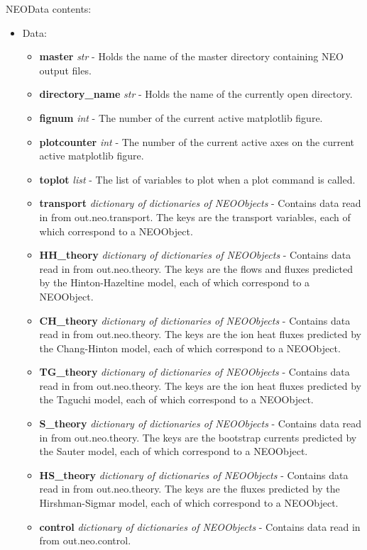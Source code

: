 \documentclass{article}
\begin{document}
NEOData contents:
\begin{itemize}
\item Data:
\begin{itemize}
\item \textbf{master} \emph{str} - Holds the name of the master directory containing NEO output files.
\item \textbf{directory\_name} \emph{str} - Holds the name of the currently open directory.
\item \textbf{fignum} \emph{int} - The number of the current active matplotlib figure.
\item \textbf{plotcounter} \emph{int} - The number of the current active axes on the current active matplotlib figure.
\item \textbf{toplot} \emph{list} - The list of variables to plot when a plot command is called.
\item \textbf{transport} \emph{dictionary of dictionaries of NEOObjects} - Contains data read in from out.neo.transport.  The keys are the transport variables, each of which correspond to a NEOObject.
\item \textbf{HH\_theory} \emph{dictionary of dictionaries of NEOObjects} - Contains data read in from out.neo.theory.  The keys are the flows and fluxes predicted by the Hinton-Hazeltine model, each of which correspond to a NEOObject.
\item \textbf{CH\_theory} \emph{dictionary of dictionaries of NEOObjects} - Contains data read in from out.neo.theory.  The keys are the ion heat fluxes predicted by the Chang-Hinton model, each of which correspond to a NEOObject.
\item \textbf{TG\_theory} \emph{dictionary of dictionaries of NEOObjects} - Contains data read in from out.neo.theory.  The keys are the ion heat fluxes predicted by the Taguchi model, each of which correspond to a NEOObject.
\item \textbf{S\_theory} \emph{dictionary of dictionaries of NEOObjects} - Contains data read in from out.neo.theory. The keys are the bootstrap currents predicted by the Sauter model, each of which correspond to a NEOObject.
\item \textbf{HS\_theory} \emph{dictionary of dictionaries of NEOObjects} - Contains data read in from out.neo.theory.  The keys are the fluxes predicted by the Hirshman-Sigmar model, each of which  correspond to a NEOObject.
\item \textbf{control} \emph{dictionary of dictionaries of NEOObjects} - Contains data read in from out.neo.control.

\end{itemize}
\end{itemize}
\end{document}
